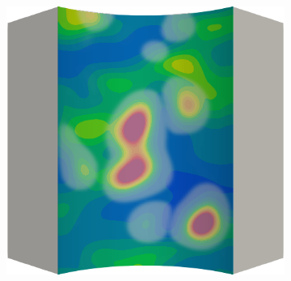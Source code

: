 \begin{frame}
\begin{columns}[T]
\begin{column}{0.6\textwidth}
\begin{figure}
{\begin{subfigure}{0.19\textwidth}
          \end{subfigure}
          \hspace{0.06\textwidth}
          \begin{subfigure}{0.19\textwidth}
            \centering
            \includegraphics[width=\textwidth]{examples/figures/ep.0018}
          \end{subfigure}
        }
        

\end{figure}
\end{column}
\end{columns}
\end{frame}
